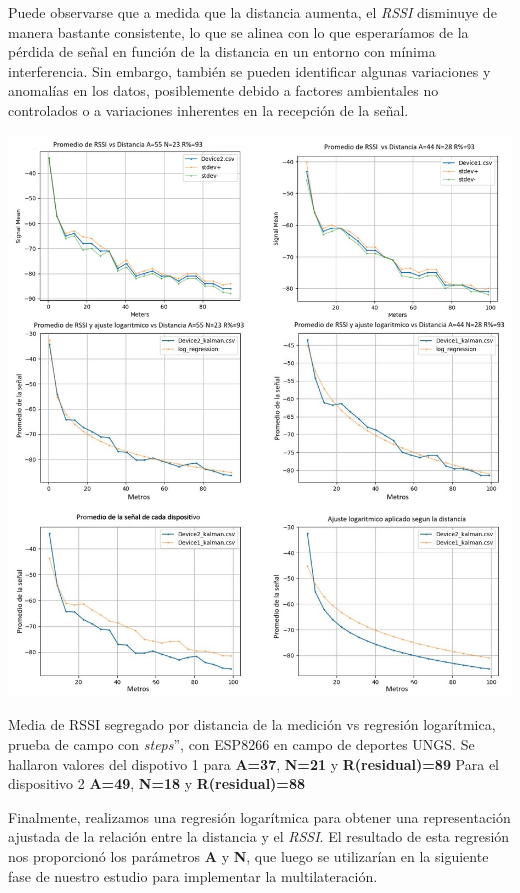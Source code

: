 Puede observarse que a medida que la distancia aumenta, el \textit{RSSI} disminuye de manera bastante consistente, lo que se alinea con lo que esperaríamos de la pérdida de señal en función de la distancia en un entorno con mínima interferencia. Sin embargo, también se pueden identificar algunas variaciones y anomalías en los datos, posiblemente debido a factores ambientales no controlados o a variaciones inherentes en la recepción de la señal.
\begin{center}
	\centering
	\includegraphics[width=1\textwidth]{Figuras/profiling/preliminar-experiment.jpg}
	\captionsetup{margin=2cm}
	\caption[Media de RSSI segregado por distancia de la medición vs regresión logarítmica, prueba de campo]{Media de RSSI segregado por distancia de la medición vs regresión logarítmica, prueba de campo con \textit{steps}”, con ESP8266 en campo de deportes UNGS. Se hallaron valores del dispotivo 1 para \textbf{A=37}, \textbf{N=21} y \textbf{R(residual)=89}
    Para el dispositivo 2 \textbf{A=49}, \textbf{N=18} y \textbf{R(residual)=88 }
 }
\label{fig:dev2-dev1-regression}
\end{center}
Finalmente, realizamos una regresión logarítmica para obtener una representación ajustada de la relación entre la distancia y el \textit{RSSI}. El resultado de esta regresión nos proporcionó los parámetros \textbf{A} y \textbf{N}, que luego se utilizarían en la siguiente fase de nuestro estudio para implementar la multilateración.

